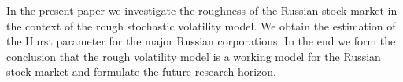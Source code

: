 In the present paper we investigate the roughness of the Russian stock market in the context of the 
rough stochastic volatility model. We obtain the estimation of the Hurst parameter for the 
major Russian corporations. In the end we form the conclusion that the rough volatility model 
is a working model for the Russian stock market and formulate the future research horizon.